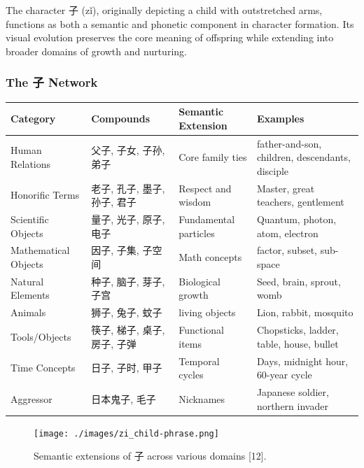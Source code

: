 \documentclass[11pt,letterpaper]{article}
\begin{document}
The character 子 (zǐ), originally depicting a child with outstretched
arms, functions as both a semantic and phonetic component in character
formation. Its visual evolution preserves the core meaning of offspring
while extending into broader domains of growth and nurturing.

\subsubsection{The 子 Network}\label{the-ux5b50-network}


\begin{longtable}{|p{3cm}|p{4cm}|p{4cm}|p{4cm}|}
\hline
\textbf{Category} & \textbf{Compounds} & \textbf{Semantic Extension} & \textbf{Examples} \\
\hline
Human Relations & 父子, 子女, 子孙, 弟子 & Core family ties & father-and-son, children, descendants, disciple \\
\hline
Honorific Terms & 老子, 孔子, 墨子, 孙子, 君子 & Respect and wisdom & Master, great teachers, gentlement \\
\hline
Scientific Objects & 量子, 光子, 原子, 电子 & Fundamental particles & Quantum, photon, atom,  electron \\
\hline
Mathematical Objects & 因子, 子集, 子空间 & Math concepts & factor, subset, sub-space \\
\hline
Natural Elements & 种子, 脑子, 芽子, 子宫 & Biological growth & Seed, brain, sprout, womb \\
\hline
Animals & 狮子, 兔子, 蚊子 & living objects & Lion, rabbit, mosquito \\
\hline
Tools/Objects & 筷子, 梯子, 桌子, 房子, 子弹 & Functional items & Chopsticks, ladder, table, house, bullet \\
\hline
Time Concepts & 日子, 子时, 甲子 & Temporal cycles & Days, midnight hour, 60-year cycle \\
\hline
Aggressor & 日本鬼子, 毛子 & Nicknames & Japanese soldier, northern invader \\
\hline
\end{longtable}

\begin{figure}
\centering
\texttt{[image: ./images/zi\_child-phrase.png]}
\caption{Semantic extensions of 子 across various domains {[}12{]}.}
\end{figure}
\end{document}
